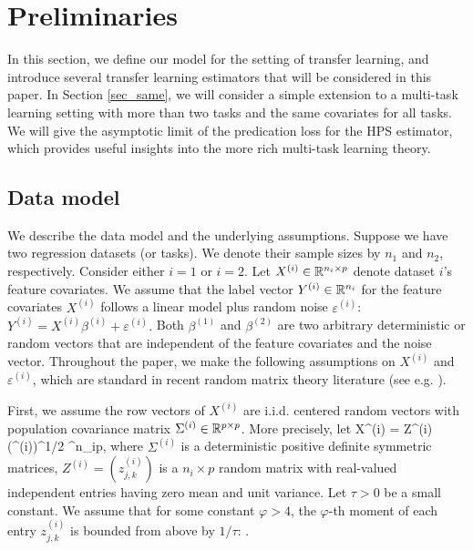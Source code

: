 \section{Preliminaries}\label{sec_HPS}
In this section, we define our model for the setting of transfer learning, and introduce several transfer learning estimators that will be considered in this paper.
In Section \ref{sec_same}, we will consider a simple extension to a multi-task learning setting with more than two tasks and  the same covariates for all tasks. We will give the asymptotic limit of the predication loss for the HPS estimator, which provides useful insights into the more rich multi-task learning theory. %

\subsection{Data model}

We describe the data model and the underlying assumptions.
Suppose we have two regression datasets (or tasks).
We denote their sample sizes by $n_1$ and $n_2$, respectively.
Consider either $i = 1$ or $i = 2$.
Let $X^{(i)} \in \mathbb{R}^{n_i \times p}$ denote dataset $i$'s feature covariates.
We assume that the label vector $Y^{(i)} \in \mathbb{R}^{n_i}$ for the feature covariates $X^{(i)}$ follows a linear model plus random noise $\varepsilon^{(i)}$:
$Y^{(i)}= X^{(i)}\beta^{(i)} + \varepsilon^{(i)}.$
Both $\beta^{(1)}$ and $\beta^{(2)}$ are two arbitrary deterministic or random vectors that are independent of the feature covariates and the noise vector.
Throughout the paper, we make the following assumptions on  $X^{(i)}$ and  $\varepsilon^{(i)}$, which are standard in recent  random matrix theory literature (see e.g. \citet{tulino2004random,bai2010spectral}). %

First, we assume the row vectors of $X^{(i)}$ are i.i.d. centered random vectors with  population covariance matrix $\Sigma^{(i)} \in \mathbb{R}^{p \times p}$. More precisely, let
\be\label{XofZ}
    X^{(i)} = Z^{(i)} (\Sigma^{(i)})^{1/2} \in \real^{n_i\times p},
\ee
where $\Sigma^{(i)}$ is a deterministic positive definite symmetric matrices, $Z^{(i)}=(z^{(i)}_{j,k})$ is a $n_i\times p$ random matrix with real-valued independent entries having zero mean and unit variance.
Let $\tau>0$ be a small constant.
We assume that for some constant $\varphi>4$, the $\varphi$-th moment of each entry $z^{(i)}_{j, k}$ is bounded from above by $1/\tau$:
\be \label{conditionA2}
  \le {}. %
\ee
 
